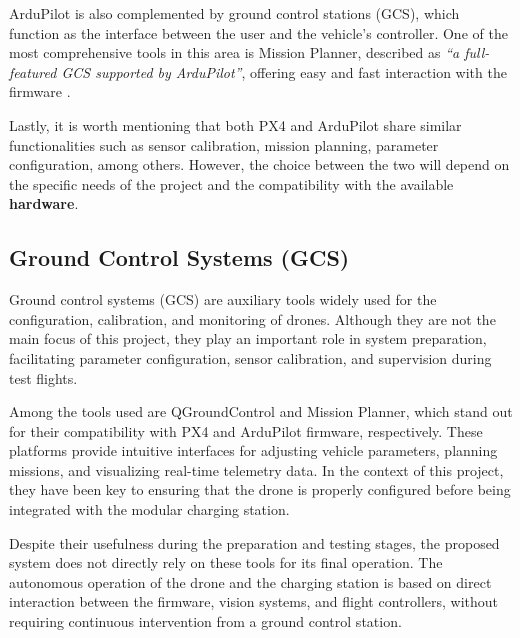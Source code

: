 ArduPilot is also complemented by ground control stations (GCS), which function as the interface between the user and the vehicle's controller. One of the most comprehensive tools in this area is Mission Planner, described as \textit{“a full-featured GCS supported by ArduPilot”}, offering easy and fast interaction with the firmware \cite{ardupilot_docs}.

Lastly, it is worth mentioning that both PX4 and ArduPilot share similar functionalities such as sensor calibration, mission planning, parameter configuration, among others. However, the choice between the two will depend on the specific needs of the project and the compatibility with the available \textbf{hardware}.

\subsection{Ground Control Systems (GCS)}
Ground control systems (GCS) are auxiliary tools widely used for the configuration, calibration, and monitoring of drones. Although they are not the main focus of this project, they play an important role in system preparation, facilitating parameter configuration, sensor calibration, and supervision during test flights.

Among the tools used are QGroundControl and Mission Planner, which stand out for their compatibility with PX4 and ArduPilot firmware, respectively. These platforms provide intuitive interfaces for adjusting vehicle parameters, planning missions, and visualizing real-time telemetry data. In the context of this project, they have been key to ensuring that the drone is properly configured before being integrated with the modular charging station.

Despite their usefulness during the preparation and testing stages, the proposed system does not directly rely on these tools for its final operation. The autonomous operation of the drone and the charging station is based on direct interaction between the firmware, vision systems, and flight controllers, without requiring continuous intervention from a ground control station.

